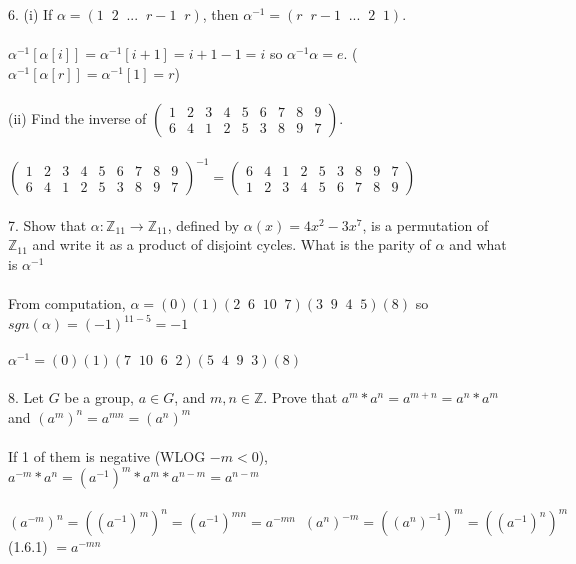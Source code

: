 \documentclass{article}
\begin{document}
\begin{siderules}
\color{blue}6. (i) If \(\alpha=(1\;\;2\;\;...\;\;r-1\;\;r)\), then \(\alpha^{-1}=(r\;\;r-1\;\;...\;\;2\;\;1)\).\\\\\color{black}
\null\qquad \(\alpha^{-1}[\alpha[i]]=\alpha^{-1}[i+1]=i+1-1=i\) so \(\alpha^{-1}\alpha=e\). (\(\alpha^{-1}[\alpha[r]]=\alpha^{-1}[1]=r\))\\\\
\color{blue}(ii) Find the inverse of \(\begin{pmatrix}1 & 2 & 3 & 4 & 5 & 6 & 7 & 8 & 9 \\ 6 & 4 & 1 & 2 & 5 & 3 & 8 & 9 & 7\end{pmatrix}\).\\\\\color{black}
\null\qquad \(\begin{pmatrix}1 & 2 & 3 & 4 & 5 & 6 & 7 & 8 & 9 \\ 6 & 4 & 1 & 2 & 5 & 3 & 8 & 9 & 7\end{pmatrix}^{-1}=\begin{pmatrix}6 & 4 & 1 & 2 & 5 & 3 & 8 & 9 & 7 \\ 1 & 2 & 3 & 4 & 5 & 6 & 7 & 8 & 9\end{pmatrix}\)\\\\
\color{blue}7. Show that \(\alpha: \mathbb{Z}_{11}\to\mathbb{Z}_{11}\), defined by \(\alpha(x)=4x^{2}-3x^{7}\), is a permutation of \(\mathbb{Z}_{11}\) and write it as a product of disjoint cycles. What is the parity of \(\alpha\) and what is \(\alpha^{-1}\)\\\\\color{black}
\null\qquad From computation, \(\alpha=(0)(1)(2\;\;6\;\;10\;\;7)(3\;\;9\;\;4\;\;5)(8)\) so \(sgn(\alpha)=(-1)^{11-5}=-1\)\\\\
\null\qquad \(\alpha^{-1}=(0)(1)(7\;\;10\;\;6\;\;2)(5\;\;4\;\;9\;\;3)(8)\)\\\\
\color{blue}8. Let \(G\) be a group, \(a\in G\), and \(m,n\in\mathbb{Z}\). Prove that \(a^{m}*a^{n}=a^{m+n}=a^{n}*a^{m}\) and \((a^{m})^{n}=a^{mn}=(a^{n})^{m}\)\\\\\color{black}
\null\qquad If 1 of them is negative (WLOG \(-m<0\)), \(a^{-m}*a^{n}=(a^{-1})^{m}*a^{m}*a^{n-m}=a^{n-m}\)\\\\
\null\qquad \((a^{-m})^{n}=((a^{-1})^{m})^{n}=(a^{-1})^{mn}=a^{-mn}\;\;(a^{n})^{-m}=((a^{n})^{-1})^{m}=((a^{-1})^{n})^{m}\) \color{gray} (1.6.1) \color{black}\(=a^{-mn}\)\\\\

\end{siderules}
\end{document}
